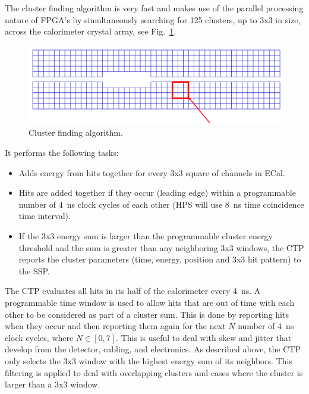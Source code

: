 The cluster finding algorithm is very fast and makes use of the parallel processing nature of FPGA's by simultaneously searching for 125 clusters, up to 3x3 in size, across the calorimeter crystal array, see 
Fig.~\ref{fig:hps_trigger_3x3}. 
\begin{figure}[h]
\includegraphics[scale=0.4]{daq_trigger/figures/hps_trigger_3x3}
\caption{\small{Cluster finding algorithm.}}
\label{fig:hps_trigger_3x3}
\end{figure}
It performs the following tasks:
\begin{itemize}
\item Adds energy from hits together for every 3x3 square of channels in ECal.
\item Hits are added together if they occur (leading edge) within a programmable number of 4~ns clock cycles of each other (HPS will use 8~ns time coincidence time interval).
\item If the 3x3 energy sum is larger than the programmable cluster energy threshold and the sum is greater than any neighboring 3x3 windows, the CTP reports the cluster parameters (time, energy, position and 3x3 hit pattern) to the SSP. 
\end{itemize}
The CTP evaluates all hits in its half of the calorimeter every 4~ns. A programmable time window is used to allow hits that are out of time with each other to be considered as part of a cluster sum. This is done by reporting hits when they occur and then reporting them again for the next $N$ number of 4~ns clock cycles, where $N \in [0,7]$. This is useful to deal with skew and jitter that develop from the detector, cabling, and electronics. As described above, the CTP only selects the 3x3 window with the highest energy sum of its neighbors. This filtering is applied to deal with overlapping clusters and cases where the cluster is larger than a 3x3 window.
